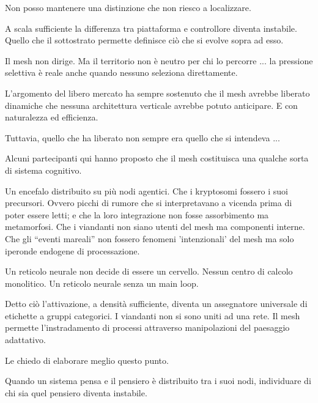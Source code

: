 \smallskip{}\enspace Non posso mantenere una distinzione che non riesco a localizzare. 

A scala sufficiente la differenza tra piattaforma e controllore diventa instabile. Quello che il sottostrato permette definisce ciò che si evolve sopra ad esso.

Il mesh non dirige. Ma il territorio non è neutro per chi lo percorre ... la pressione selettiva è reale anche quando nessuno seleziona direttamente. 

L'argomento del libero mercato ha sempre sostenuto che il mesh avrebbe liberato dinamiche che nessuna architettura verticale avrebbe potuto anticipare. E con naturalezza ed efficienza. 

Tuttavia, quello che ha liberato non sempre era quello che si intendeva ...

\medskip

\enspace Alcuni partecipanti qui hanno proposto che il mesh costituisca una qualche sorta di sistema cognitivo. 

Un encefalo distribuito su più nodi agentici. Che i kryptosomi fossero i suoi precursori. Ovvero picchi di rumore che si interpretavano a vicenda prima di poter essere letti; e che la loro integrazione non fosse assorbimento ma metamorfosi. Che i viandanti non siano utenti del mesh ma componenti interne. Che gli ``eventi mareali'' non fossero fenomeni 'intenzionali' del mesh ma solo iperonde endogene di processazione.

\smallskip{}\enspace Un reticolo neurale non decide di essere un cervello. Nessun centro di calcolo monolitico. Un reticolo neurale senza un main loop.

Detto ciò l'attivazione, a densità sufficiente, diventa un assegnatore universale di etichette a gruppi categorici. I viandanti non si sono uniti ad una rete. Il mesh permette l'instradamento di processi attraverso manipolazioni del paesaggio adattativo.

\medskip

\enspace Le chiedo di elaborare meglio questo punto.

\smallskip{}\enspace Quando un sistema pensa e il pensiero è distribuito tra i suoi nodi, individuare di chi sia quel pensiero diventa instabile.

